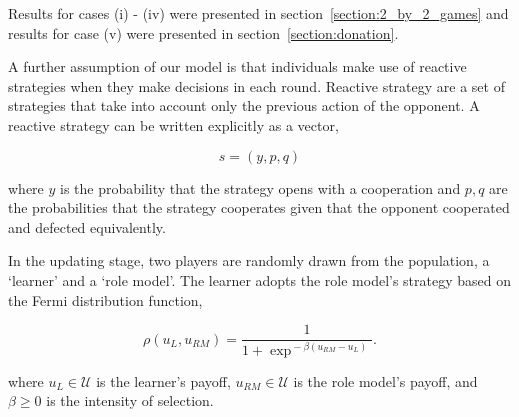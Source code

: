 \documentclass[11pt]{article}
\theoremstyle{plainCl1}
\theoremstyle{plainCl2}
\begin{document}
\begin{table}[!htbp]
  \begin{center}
  \end{center}
  \caption{We present results on the all of the listed social dilemmas. The payoffs'
  constrains are different for each game.}
  \label{table:social_dilemmas}
\end{table}

Results for cases (i) - (iv) were presented in section~\ref{section:2_by_2_games}
and results for case (v) were presented in section~\ref{section:donation}.

A further assumption of our model is that individuals make use of reactive
strategies when they make decisions in each round. Reactive strategy are a set
of strategies that take into account only the previous action of the opponent.
A reactive strategy can be written explicitly as a vector,

\[s=(y, p, q)\]

where \(y\) is the probability that the strategy opens with a cooperation and
\(p, q\) are the probabilities that the strategy cooperates given that the
opponent cooperated and defected equivalently.

In the updating stage, two players are randomly drawn from the population, a
`learner' and a `role model'. The learner adopts the role model's strategy
based on the Fermi distribution function, %

\begin{equation} \label{Eq:rho}
\rho(u_{L}, u_{RM}) = \frac{1}{1\!+\! \exp^{\!-\!\beta (u_{RM}\!-\!u_{L})}}.
\end{equation}

where $u_{L}\!\in\! \mathcal{U}$ is the learner's payoff, $u_{RM}\!\in\!
\mathcal{U}$ is the role model's payoff, and $\beta\!\ge\!0$ is the intensity of
selection.
\end{document}
